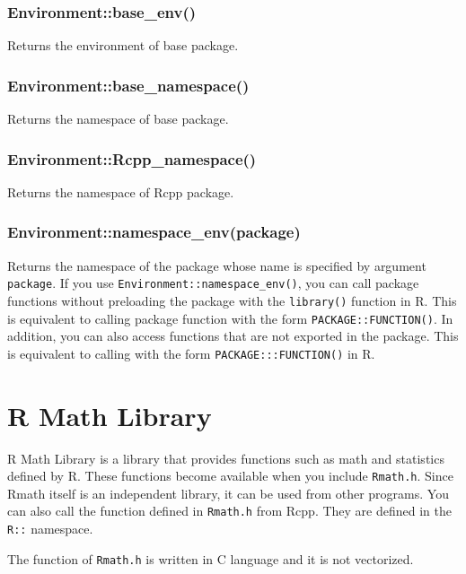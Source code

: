 \documentclass[]{book}
\theoremstyle{definition}
\theoremstyle{definition}
\theoremstyle{remark}
\begin{document}
\subsection{Environment::base\_env()}\label{environmentbase_env}

Returns the environment of base package.

\subsection{Environment::base\_namespace()}\label{environmentbase_namespace}

Returns the namespace of base package.

\subsection{Environment::Rcpp\_namespace()}\label{environmentrcpp_namespace}

Returns the namespace of Rcpp package.

\subsection{Environment::namespace\_env(package)}\label{environmentnamespace_envpackage}

Returns the namespace of the package whose name is specified by argument
\texttt{package}. If you use \texttt{Environment::namespace\_env()}, you
can call package functions without preloading the package with the
\texttt{library()} function in R. This is equivalent to calling package
function with the form \texttt{PACKAGE::FUNCTION()}. In addition, you
can also access functions that are not exported in the package. This is
equivalent to calling with the form \texttt{PACKAGE:::FUNCTION()} in R.

\chapter{R Math Library}\label{r-math-library}

R Math Library is a library that provides functions such as math and
statistics defined by R. These functions become available when you
include \texttt{Rmath.h}. Since Rmath itself is an independent library,
it can be used from other programs. You can also call the function
defined in \texttt{Rmath.h} from Rcpp. They are defined in the
\texttt{R::} namespace.

The function of \texttt{Rmath.h} is written in C language and it is not
vectorized.
\end{document}
